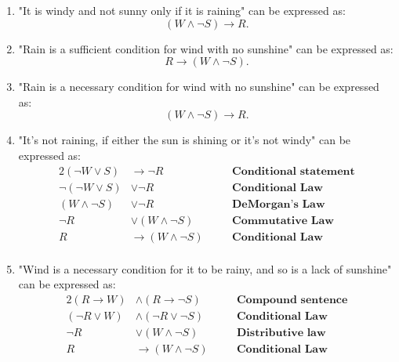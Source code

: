\begin{enumerate}[label=(\alph*)]
    \item "It is windy and not sunny only if it is raining" can be expressed as: $$(W \wedge \neg S) \rightarrow R.$$
    \item "Rain is a sufficient condition for wind with no sunshine" can be expressed as: $$R \rightarrow (W \wedge \neg S).$$
    \item "Rain is a necessary condition for wind with no sunshine" can be expressed as: $$(W \wedge \neg S) \rightarrow R.$$
    \item "It's not raining, if either the sun is shining or it's not windy" can be expressed as: 
        \begin{alignat*}{2}
        (\neg W \vee S) & \rightarrow \neg R && \quad \textbf{Conditional statement}\\
        \neg (\neg W \vee S) & \vee \neg R && \quad \textbf{Conditional Law}\\
        (W \wedge \neg S) & \vee \neg R && \quad \textbf{DeMorgan's Law}\\
        \neg R &\vee (W \wedge \neg S) && \quad \textbf{Commutative Law}\\
        R &\rightarrow (W \wedge \neg S) && \quad \textbf{Conditional Law}\\
        \end{alignat*}
    \item "Wind is a necessary condition for it to be rainy, and so is a lack of sunshine" can be expressed as: 
        \begin{alignat*}{2}
            (R \rightarrow W) &\wedge (R \rightarrow \neg S) && \quad \textbf{Compound sentence} \\   
            (\neg R \vee W) &\wedge (\neg R \vee \neg S) && \quad \textbf{Conditional Law} \\  
            \neg R &\vee (W \wedge \neg S) && \quad \textbf{Distributive law} \\  
            R &\rightarrow (W \wedge \neg S) && \quad \textbf{Conditional Law} \\
        \end{alignat*}
    

\end{enumerate}

